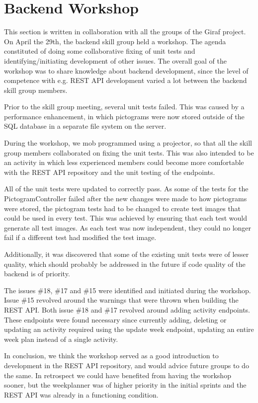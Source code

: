 \section{Backend Workshop}
This section is written in collaboration with all the groups of the Giraf project. On April the 29th, the backend skill group held a workshop. The agenda constituted of doing some collaborative fixing of unit tests and identifying/initiating development of other issues. The overall goal of the workshop was to share knowledge about backend development, since the level of competence with e.g. REST API development varied a lot between the backend skill group members.

Prior to the skill group meeting, several unit tests failed. This was caused by a performance enhancement, in which pictograms were now stored outside of the SQL database in a separate file system on the server.

During the workshop, we mob programmed using a projector, so that all the skill group members collaborated on fixing the unit tests. This was also intended to be an activity in which less experienced members could become more comfortable with the REST API repository and the unit testing of the endpoints.

All of the unit tests were updated to correctly pass. As some of the tests for the PictogramController failed after the new changes were made to how pictograms were stored, the pictogram tests had to be changed to create test images that could be used in every test. This was achieved by ensuring that each test would generate all test images. As each test was now independent, they could no longer fail if a different test had modified the test image.

Additionally, it was discovered that some of the existing unit tests were of lesser quality, which should probably be addressed in the future if code quality of the backend is of priority.

The issues \#18, \#17 and \#15 were identified and initiated during the workshop. Issue \#15 revolved around the warnings that were thrown when building the REST API. Both issue \#18 and \#17 revolved around adding activity endpoints. These endpoints were found necessary since currently adding, deleting or updating an activity required using the update week endpoint, updating an entire week plan instead of a single activity.

In conclusion, we think the workshop served as a good introduction to development in the REST API repository, and would advice future groups to do the same. In retrospect we could have benefited from having the workshop sooner, but the weekplanner was of higher priority in the initial sprints and the REST API was already in a functioning condition.